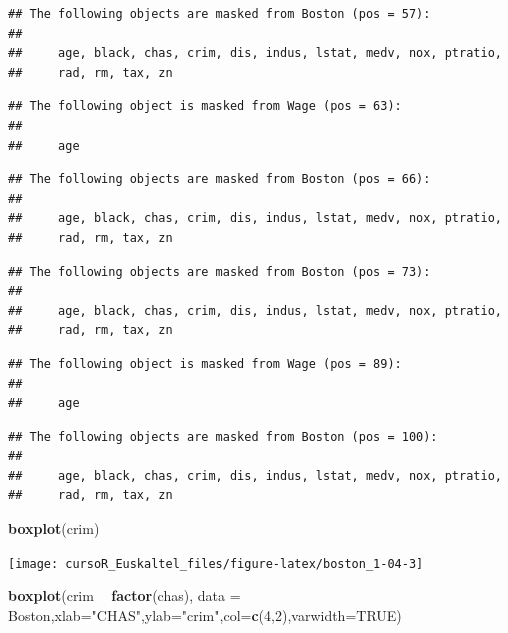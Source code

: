 \documentclass[]{book}
\newenvironment{Shaded}{\begin{snugshade}}{\end{snugshade}}
\newcommand{\KeywordTok}[1]{\textcolor[rgb]{0.13,0.29,0.53}{\textbf{#1}}}
\newcommand{\DataTypeTok}[1]{\textcolor[rgb]{0.13,0.29,0.53}{#1}}
\newcommand{\DecValTok}[1]{\textcolor[rgb]{0.00,0.00,0.81}{#1}}
\newcommand{\StringTok}[1]{\textcolor[rgb]{0.31,0.60,0.02}{#1}}
\newcommand{\OtherTok}[1]{\textcolor[rgb]{0.56,0.35,0.01}{#1}}
\newcommand{\OperatorTok}[1]{\textcolor[rgb]{0.81,0.36,0.00}{\textbf{#1}}}
\newcommand{\NormalTok}[1]{#1}
\begin{document}
\begin{verbatim}
## The following objects are masked from Boston (pos = 57):
## 
##     age, black, chas, crim, dis, indus, lstat, medv, nox, ptratio,
##     rad, rm, tax, zn
\end{verbatim}

\begin{verbatim}
## The following object is masked from Wage (pos = 63):
## 
##     age
\end{verbatim}

\begin{verbatim}
## The following objects are masked from Boston (pos = 66):
## 
##     age, black, chas, crim, dis, indus, lstat, medv, nox, ptratio,
##     rad, rm, tax, zn
\end{verbatim}

\begin{verbatim}
## The following objects are masked from Boston (pos = 73):
## 
##     age, black, chas, crim, dis, indus, lstat, medv, nox, ptratio,
##     rad, rm, tax, zn
\end{verbatim}

\begin{verbatim}
## The following object is masked from Wage (pos = 89):
## 
##     age
\end{verbatim}

\begin{verbatim}
## The following objects are masked from Boston (pos = 100):
## 
##     age, black, chas, crim, dis, indus, lstat, medv, nox, ptratio,
##     rad, rm, tax, zn
\end{verbatim}

\begin{Shaded}
\begin{Highlighting}[]
\KeywordTok{boxplot}\NormalTok{(crim)}
\end{Highlighting}
\end{Shaded}

\begin{center}\texttt{[image: cursoR\_Euskaltel\_files/figure-latex/boston\_1-04-3]} \end{center}

\begin{Shaded}
\begin{Highlighting}[]
\KeywordTok{boxplot}\NormalTok{(crim }\OperatorTok{~}\StringTok{ }\KeywordTok{factor}\NormalTok{(chas), }\DataTypeTok{data =}\NormalTok{ Boston,}\DataTypeTok{xlab=}\StringTok{"CHAS"}\NormalTok{,}\DataTypeTok{ylab=}\StringTok{"crim"}\NormalTok{,}\DataTypeTok{col=}\KeywordTok{c}\NormalTok{(}\DecValTok{4}\NormalTok{,}\DecValTok{2}\NormalTok{),}\DataTypeTok{varwidth=}\OtherTok{TRUE}\NormalTok{)}
\end{Highlighting}
\end{Shaded}
\end{document}
